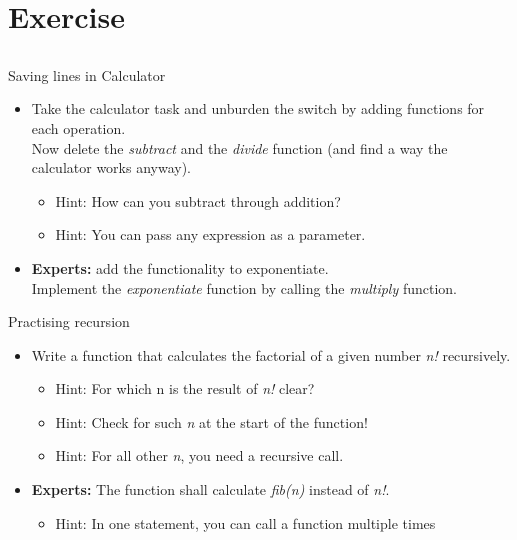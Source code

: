 \section{Exercise}
\subsection{}
\begin{frame}{Saving lines in Calculator}
	\begin{itemize}
		\item Take the calculator task and unburden the switch by adding functions for each operation.\\
		Now delete the \textit{subtract} and the \textit{divide} function (and find a way the calculator works anyway).
		\begin{itemize}
			\item<2-> Hint: How can you subtract through addition?
			\item<3-> Hint: You can pass any expression as a parameter.
		\end{itemize}
		\item \textbf{Experts:} add the functionality to exponentiate.\\
		Implement the \textit{exponentiate} function by calling the \textit{multiply} function.
	\end{itemize}
\end{frame}
\begin{frame}{Practising recursion}
	\begin{itemize}
		\item Write a function that calculates the factorial of a given number \textit{n!} recursively.
		\begin{itemize}
			\item<2-> Hint: For which n is the result of \textit{n!} clear?
			\item<3-> Hint: Check for such \textit{n} at the start of the function!
			\item<4-> Hint: For all other \textit{n}, you need a recursive call.
		\end{itemize}
		\item \textbf{Experts:} The function shall calculate \textit{fib(n)} instead of \textit{n!}.
		\begin{itemize}
			\item<5-> Hint: In one statement, you can call a function multiple times
		\end{itemize}
	\end{itemize}
\end{frame}

